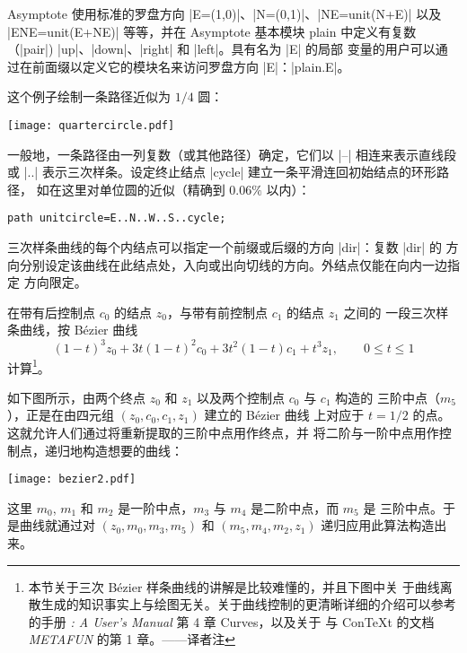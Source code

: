 \documentclass{ctexbook}
\let\leq\leqslant
\newcommand*\prgname[1]{\textsf{#1}}
\newcommand\transnote[1]{\footnote{#1——译者注}}
\begin{document}
\prgname{Asymptote} 使用标准的罗盘方向 |E=(1,0)|、|N=(0,1)|、|NE=unit(N+E)|
以及 |ENE=unit(E+NE)| 等等，并在 \prgname{Asymptote} 基本模块 \prgname{plain}
中定义有复数（|pair|) |up|、|down|、|right| 和 |left|。具有名为 |E| 的局部
变量的用户可以通过在前面缀以定义它的模块名来访问罗盘方向 |E|：|plain.E|。

这个例子绘制一条路径近似为 $1/4$ 圆：

\begin{center}
  \texttt{[image: quartercircle.pdf]}
\end{center}

一般地，一条路径由一列复数（或其他路径）确定，它们以 |--| 相连来表示直线段或
|..| 表示三次样条。设定终止结点 |cycle| 建立一条平滑连回初始结点的环形路径，
如在这里对单位圆的近似（精确到 $0.06\%$ 以内）：
\begin{lstlisting}
path unitcircle=E..N..W..S..cycle;
\end{lstlisting}

三次样条曲线的每个内结点可以指定一个前缀或后缀的方向 |{dir}|：复数 |dir| 的
方向分别设定该曲线在此结点处，入向或出向切线的方向。外结点仅能在向内一边指定
方向限定。

在带有后控制点 $c_0$ 的结点 $z_0$，与带有前控制点 $c_1$ 的结点 $z_1$ 之间的
一段三次样条曲线，按 Bézier 曲线
\begin{equation*}
  (1-t)^3 z_0 + 3t(1-t)^2 c_0 + 3t^2 (1-t) c_1 + t^3 z_1, \qquad 0\leq t\leq 1
\end{equation*}
计算\transnote{本节关于三次 Bézier 样条曲线的讲解是比较难懂的，并且下图中关
于曲线离散生成的知识事实上与绘图无关。关于曲线控制的更清晰详细的介绍可以参考
\MP{} 的手册 \textit{\MP{}: A User's Manual} 第 4 章 Curves，以及关于 \MP{} 
与 Con\TeX{}t 的文档 \textit{METAFUN} 的第 1 章。}。

如下图所示，由两个终点 $z_0$ 和 $z_1$ 以及两个控制点 $c_0$ 与 $c_1$ 构造的
三阶中点（$m_5$），正是在由四元组 $(z_0, c_0, c_1, z_1)$ 建立的 Bézier 曲线
上对应于 $t = 1/2$ 的点。这就允许人们通过将重新提取的三阶中点用作终点，并
将二阶与一阶中点用作控制点，递归地构造想要的曲线：
\begin{center}
  \texttt{[image: bezier2.pdf]}
\end{center}
这里 $m_0$, $m_1$ 和 $m_2$ 是一阶中点，$m_3$ 与 $m_4$ 是二阶中点，而 $m_5$ 是
三阶中点。于是曲线就通过对 $(z_0, m_0, m_3, m_5)$ 和 $(m_5, m_4, m_2, z_1)$
递归应用此算法构造出来。
\end{document}

